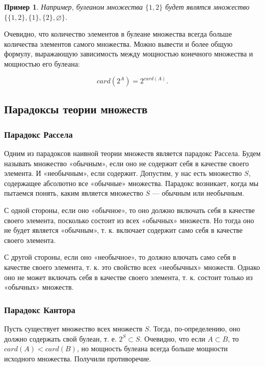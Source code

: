 \documentclass{article}
\theoremstyle{plain}
\newtheorem*{example*}{Пример}
\theoremstyle{definition}
\begin{document}
\begin{example*}
	Например, булеаном множества \(\{1, 2\}\) будет являтся множество \(\{ \{1, 2\}, \{1\}, \{2\}, \varnothing \}\).
\end{example*}

Очевидно, что количество элементов в булеане множества всегда больше количества элементов самого множества. Можно вывести и более общую формулу, выражающую зависимость между мощностью конечного множества и мощностью его булеана:

\[
	card(2^A) = 2^{card(A)}.
\]

\subsection{Парадоксы теории множеств}

\subsubsection{Парадокс Рассела}

Одним из парадоксов наивной теории множеств является парадокс Рассела. Будем называть множество «обычным», если оно не содержит себя в качестве своего элемента. И «необычным», если содержит. Допустим, у нас есть множество \(S\), содержащее абсолютно все «обычные» множества. Парадокс возникает, когда мы пытаемся понять, каким является множество \(S\) — обычным или необычным.

С одной стороны, если оно «обычное», то оно должно включать себя в качестве своего элемента, посколько состоит из всех «обычных» множеств. Но тогда оно не будет является «обычным», т. к. включает содержит само себя в качестве своего элемента.

С другой стороны, если оно «необычное», то должно влючать само себя в качестве своего элемента, т. к. это свойство всех «необычных» множеств. Однако оно не может включать себя в качестве своего элемента, т. к. состоит только из «обычных» множеств.

\subsubsection{Парадокс Кантора}

Пусть существует множество всех множеств \(S\). Тогда, по-определению, оно должно содержать свой булеан, т. е. \(2^S \subset S\). Очевидно, что если \(A \subset B\), то \(card(A) < card(B)\), но мощность булеана всегда больше мощности исходного множества. Получили противоречие.
\end{document}

